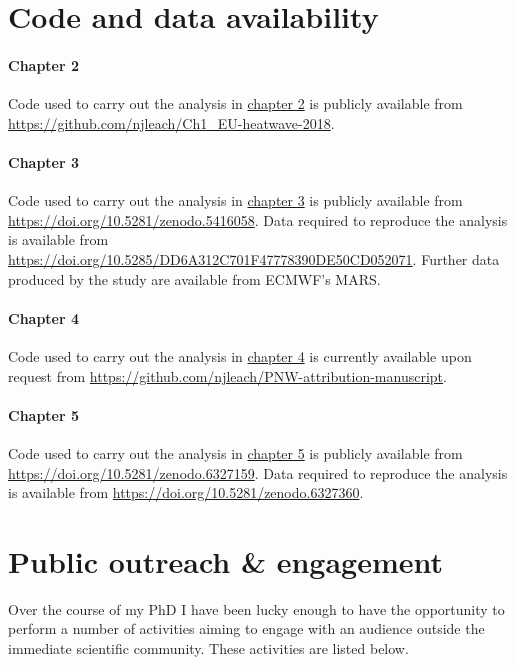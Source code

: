 \section{Code and data availability}

  \paragraph*{Chapter 2}
    
    Code used to carry out the analysis in \hyperref[ch2]{chapter 2} is publicly available from \url{https://github.com/njleach/Ch1_EU-heatwave-2018}.

  \paragraph*{Chapter 3}
    
    Code used to carry out the analysis in \hyperref[ch3]{chapter 3} is publicly available from \url{https://doi.org/10.5281/zenodo.5416058}. Data required to reproduce the analysis is available from \url{https://doi.org/10.5285/DD6A312C701F47778390DE50CD052071}. Further data produced by the study are available from ECMWF's MARS.

  \paragraph*{Chapter 4}
    
    Code used to carry out the analysis in \hyperref[ch4]{chapter 4} is currently available upon request from \url{https://github.com/njleach/PNW-attribution-manuscript}.

  \paragraph*{Chapter 5}
    
    Code used to carry out the analysis in \hyperref[ch5]{chapter 5} is publicly available from \url{https://doi.org/10.5281/zenodo.6327159}. Data required to reproduce the analysis is available from \url{https://doi.org/10.5281/zenodo.6327360}.

\section{Public outreach \& engagement}

  Over the course of my PhD I have been lucky enough to have the opportunity to perform a number of activities aiming to engage with an audience outside the immediate scientific community. These activities are listed below.

